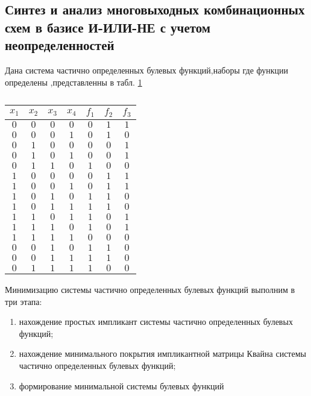\documentclass[12pt,a4paper]{article}
\begin{document}
	
	
	
	\begin{center}
	\large
	\section*{ \textbf{Синтез и анализ многовыходных комбинационных схем	в базисе И-ИЛИ-НЕ с учетом неопределенностей} }
	\end{center}


Дана система частично определенных булевых функций,наборы где функции определены ,представленны в табл. \ref{h1}


\begin{table}[h!]
	\caption{\label{h1} }
	\begin{center}
		\begin{tabular}{|c|c|c|c||c|c|c|}
			\hline
$x_1$ & $x_2$ & $x_3$ & $x_4$ & $f_1$ & $f_2$ & $f_3$ \\
\hline		

$0$ & $0$ & $0$ & $0$ & $0$ & $1$ & $1$ \\
\hline
$0$ & $0$ & $0$ & $1$ & $0$ & $1$ & $0$ \\
\hline
$0$ & $1$ & $0$ & $0$ & $0$ & $0$ & $1$ \\
\hline
$0$ & $1$ & $0$ & $1$ & $0$ & $0$ & $1$ \\
\hline
$0$ & $1$ & $1$ & $0$ & $1$ & $0$ & $0$ \\
\hline
$1$ & $0$ & $0$ & $0$ & $0$ & $1$ & $1$ \\
\hline
$1$ & $0$ & $0$ & $1$ & $0$ & $1$ & $1$ \\
\hline
$1$ & $0$ & $1$ & $0$ & $1$ & $1$ & $0$ \\
\hline
$1$ & $0$ & $1$ & $1$ & $1$ & $1$ & $0$ \\
\hline
$1$ & $1$ & $0$ & $1$ & $1$ & $0$ & $1$ \\
\hline
$1$ & $1$ & $1$ & $0$ & $1$ & $0$ & $1$ \\
\hline
$1$ & $1$ & $1$ & $1$ & $0$ & $0$ & $0$ \\
\hline
$0$ & $0$ & $1$ & $0$ & $1$ & $1$ & $0$ \\
\hline
$0$ & $0$ & $1$ & $1$ & $1$ & $1$ & $0$ \\
\hline
$0$ & $1$ & $1$ & $1$ & $1$ & $0$ & $0$ \\
\hline
		\end{tabular}
	\end{center}
\end{table} 


Минимизацию системы частично определенных булевых функций
выполним в три этапа:
\begin{enumerate} 
\item нахождение простых импликант системы частично определенных
булевых функций;
\item нахождение минимального покрытия импликантной матрицы
Квайна системы частично определенных булевых функций;
\item формирование минимальной системы булевых функций
\end{enumerate}
\end{document}
